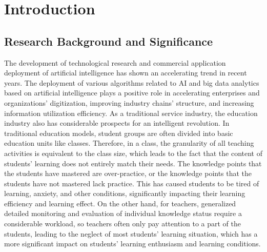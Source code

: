 
\chapter{Introduction}  %

\ifpdf
    \graphicspath{{Chapter1/Figs/Raster/}{Chapter1/Figs/PDF/}{Chapter1/Figs/}}
\else
    \graphicspath{{Chapter1/Figs/Vector/}{Chapter1/Figs/}}
\fi


\section{Research Background and Significance} %

The development of technological research and commercial application deployment of artificial intelligence has shown an accelerating trend in recent years. The deployment of various algorithms related to AI and big data analytics based on artificial intelligence plays a positive role in accelerating enterprises and organizations' digitization, improving industry chains' structure, and increasing information utilization efficiency. As a traditional service industry, the education industry also has considerable prospects for an intelligent revolution. In traditional education models, student groups are often divided into basic education units like classes. Therefore, in a class, the granularity of all teaching activities is equivalent to the class size, which leads to the fact that the content of students' learning does not entirely match their needs. The knowledge points that the students have mastered are over-practice, or the knowledge points that the students have not mastered lack practice. This has caused students to be tired of learning, anxiety, and other conditions, significantly impacting their learning efficiency and learning effect. On the other hand, for teachers, generalized detailed monitoring and evaluation of individual knowledge status require a considerable workload, so teachers often only pay attention to a part of the students, leading to the neglect of most students' learning situation, which has a more significant impact on students' learning enthusiasm and learning conditions.

